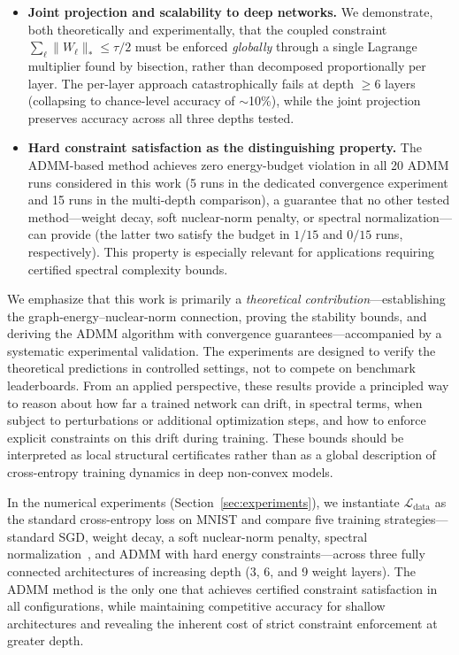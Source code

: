 \documentclass[a4paper,fleqn]{cas-sc}
\theoremstyle{remark}
\theoremstyle{definition}
\begin{document}
\begin{itemize}
	\item \textbf{Joint projection and scalability to deep networks.}
	We demonstrate, both theoretically and experimentally, that the coupled constraint $\sum_\ell\|W_\ell\|_*\le\tau/2$ must be enforced \emph{globally} through a single Lagrange multiplier found by bisection, rather than decomposed proportionally per layer. The per-layer approach catastrophically fails at depth $\ge 6$ layers (collapsing to chance-level accuracy of $\sim$10\%), while the joint projection preserves accuracy across all three depths tested.
	
	\item \textbf{Hard constraint satisfaction as the distinguishing property.}
	The ADMM-based method achieves zero energy-budget violation in all 20 ADMM runs considered in this work (5 runs in the dedicated convergence experiment and 15 runs in the multi-depth comparison), a guarantee that no other tested method---weight decay, soft nuclear-norm penalty, or spectral normalization---can provide (the latter two satisfy the budget in $1/15$ and $0/15$ runs, respectively). This property is especially relevant for applications requiring certified spectral complexity bounds.
\end{itemize}


We emphasize that this work is primarily a \emph{theoretical contribution}---establishing the graph-energy--nuclear-norm connection, proving the stability bounds, and deriving the ADMM algorithm with convergence guarantees---accompanied by a systematic experimental validation. The experiments are designed to verify the theoretical predictions in controlled settings, not to compete on benchmark leaderboards. From an applied perspective, these results provide a principled way to reason about how far a trained network can drift, in spectral terms, when subject to perturbations or additional optimization steps, and how to enforce explicit constraints on this drift during training.
These bounds should be interpreted as local structural certificates rather than as a global description of cross-entropy training dynamics in deep non-convex models.

In the numerical experiments (Section~\ref{sec:experiments}), we instantiate $\mathcal{L}_{\text{data}}$ as the standard cross-entropy loss on MNIST and compare five training strategies---standard SGD, weight decay, a soft nuclear-norm penalty, spectral normalization~\cite{Miyato2018SpectralNorm}, and ADMM with hard energy constraints---across three fully connected architectures of increasing depth (3, 6, and 9 weight layers). The ADMM method is the only one that achieves certified constraint satisfaction in all configurations, while maintaining competitive accuracy for shallow architectures and revealing the inherent cost of strict constraint enforcement at greater depth.
\end{document}
